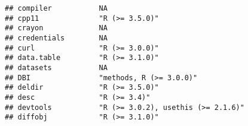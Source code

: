 \documentclass[
]{article}
\begin{document}
\begin{verbatim}
## compiler           NA                                                                                                                                                                                                    
## cpp11              "R (>= 3.5.0)"                                                                                                                                                                                        
## crayon             NA                                                                                                                                                                                                    
## credentials        NA                                                                                                                                                                                                    
## curl               "R (>= 3.0.0)"                                                                                                                                                                                        
## data.table         "R (>= 3.1.0)"                                                                                                                                                                                        
## datasets           NA                                                                                                                                                                                                    
## DBI                "methods, R (>= 3.0.0)"                                                                                                                                                                               
## deldir             "R (>= 3.5.0)"                                                                                                                                                                                        
## desc               "R (>= 3.4)"                                                                                                                                                                                          
## devtools           "R (>= 3.0.2), usethis (>= 2.1.6)"                                                                                                                                                                    
## diffobj            "R (>= 3.1.0)"                                                                                                                                                                                        

\end{verbatim}
\end{document}
